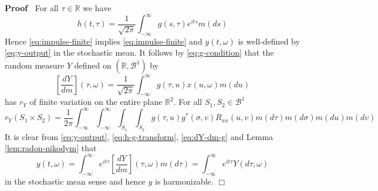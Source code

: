 \documentclass{article}
\newenvironment{proof}{\noindent\textbf{Proof\ }}{\hspace*{\fill}$\Box$\medskip}
\begin{document}
\begin{proof}
  For all $\tau \in \mathbb{R}$ we have
  \begin{equation}
    h (t, \tau) = \frac{1}{\sqrt{2 \pi}}  \int_{- \infty}^{\infty} g (s, \tau)
    e^{its} m (ds) \label{eq:h-g-transform}
  \end{equation}
  Hence \eqref{eq:impulse-finite} implies \eqref{eq:impulse-finite} and $y (t,
  \omega)$ is well-defined by \eqref{eq:y-output} in the stochastic mean. It
  follows by \eqref{eq:g-condition} that the random measure $Y$ defined on
  $(\mathbb{R}, \mathscr{B}^1)$ by
  \begin{equation}
    \left[ \frac{dY}{dm} \right] (\tau, \omega) = \frac{1}{\sqrt{2 \pi}} 
    \int_{- \infty}^{\infty} g (\tau, u) x (u, \omega) m (du)
    \label{eq:dY-dm-g}
  \end{equation}
  has $r_Y$ of finite variation on the entire plane $\mathbb{R}^2$. For all
  $S_1, S_2 \in \mathscr{B}^1$
  \begin{equation}
    r_Y  (S_1 \times S_2) = \frac{1}{2 \pi}  \int_{- \infty}^{\infty} \int_{-
    \infty}^{\infty} \int_{S_1} \int_{S_2} g (\tau, u) g^{\ast} (\sigma, v)
    R_{xx} (u, v) m (d \tau) m (d \sigma) m (du) m (dv) \label{eq:rY-g}
  \end{equation}
  It is clear from \eqref{eq:y-output}, \eqref{eq:h-g-transform},
  \eqref{eq:dY-dm-g} and Lemma \ref{lem:radon-nikodym} that
  \begin{equation}
    y (t, \omega) = \int_{- \infty}^{\infty} e^{it \tau} \left[ \frac{dY}{dm}
    \right] (\tau, \omega) m (d \tau) = \int_{- \infty}^{\infty} e^{it \tau} Y
    (d \tau, \omega) \label{eq:y-harmonize}
  \end{equation}
  in the stochastic mean sense and hence $y$ is harmonizable.
\end{proof}
\end{document}
